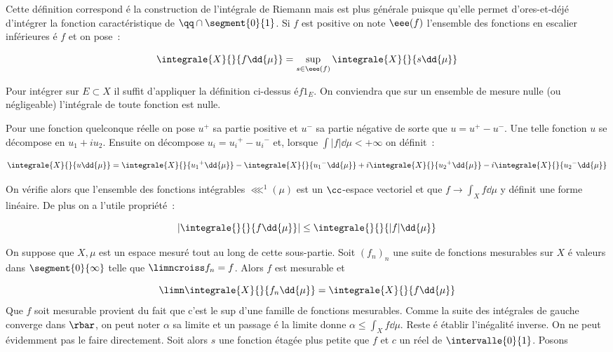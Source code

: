 \rmq Cette définition correspond é la construction de l'intégrale de Riemann mais est plus générale puisque qu'elle
permet d'ores-et-déjé d'intégrer la fonction caractéristique de $\qq\cap\segment{0}{1}$.
 Si $f$ est positive on note $\eee(f)$ l'ensemble des fonctions
en escalier in\-fé\-rieu\-res é $f$ et on pose~:\par
$$\integrale{X}{}{f\dd{\mu}} = \sup_{s\in \eee(f)}\integrale{X}{}{s\dd{\mu}}$$\par
Pour intégrer sur $E\subset X$ il suffit d'appliquer la définition ci-dessus é$f 1_E$.
On conviendra que sur un ensemble de mesure nulle (ou négligeable) l'intégrale de toute fonction est nulle.\par
Pour une fonction quelconque réelle on pose $u^+$ sa partie positive et $u^-$ sa partie négative de sorte que 
$u = u^+ - u^-$.
Une telle fonction $u$ se décompose en $u_1+iu_2$. Ensuite on décompose $u_i = {u_i}^+-{u_i}^-$ et, lorsque 
$\int \lvert f\rvert\dd{\mu}<+\infty$ on définit~:\par
$$\integrale{X}{}{u\dd{\mu}}=\integrale{X}{}{{u_1}^+\dd{\mu}}-\integrale{X}{}{{u_1}^-\dd{\mu}}+
  i\integrale{X}{}{{u_2}^+\dd{\mu}}-i\integrale{X}{}{{u_2}^-\dd{\mu}}$$\par
On vérifie alors que l'ensemble des fonctions intégrables $\lll^1(\mu)$ est un $\cc$-espace vectoriel et que $f\to
\int_X f\dd{\mu}$ y définit une forme linéaire. De plus on a l'utile propriété~:\par
$$\left\lvert\integrale{}{}{f\dd{\mu}}\right\rvert\leq \integrale{}{}{\lvert f\rvert\dd{\mu}}$$\par
{}
On suppose que $X, \mu$ est un espace mesuré tout au long de cette sous-partie.
 Soit $(f_n)_n$ une suite de fonctions mesurables sur $X$ é valeurs dans 
$\segment{0}{\infty}$ telle que $\limncroiss f_n = f$. Alors $f$ est mesurable et\par
$$\limn \integrale{X}{}{f_n\dd{\mu}} = \integrale{X}{}{f\dd{\mu}}$$
\dem Que $f$ soit mesurable provient du fait que c'est le sup d'une famille de fonctions mesurables. Comme la suite
des intégrales de gauche converge dans $\rbar$, on peut noter $\alpha$ sa limite et un passage é la limite donne 
$\alpha\leq\int_X f\dd{\mu}$. Reste é établir l'inégalité inverse. On ne peut évidemment pas le faire directement.
Soit alors $s$ une fonction étagée plus petite que $f$ et $c$ un réel de $\intervalle{0}{1}$. Posons 
